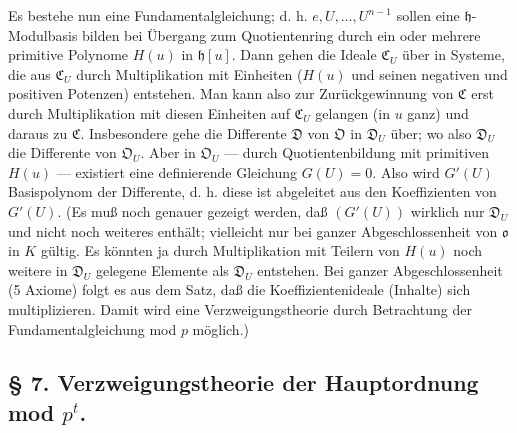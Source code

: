 Es bestehe nun eine Fundamentalgleichung; d. h. $e,U,\ldots,U^{n-1}$ sollen eine $\mathfrak h$-Modulbasis bilden bei Übergang zum Quotientenring durch ein oder mehrere primitive Polynome $H(u)$ in $\mathfrak h[u]$. Dann gehen die Ideale $\mathfrak C_U$ über in Systeme, die aus $\mathfrak C_U$ durch Multiplikation mit Einheiten ($H(u)$ und seinen negativen und positiven Potenzen) entstehen. Man kann also zur Zurückgewinnung von $\mathfrak C$ erst durch Multiplikation mit diesen Einheiten auf $\mathfrak C_U$ gelangen (in $u$ ganz) und daraus zu $\mathfrak C$. Insbesondere gehe die Differente $\mathfrak D$ von $\mathfrak O$ in $\mathfrak D_U$ über; wo also $\mathfrak D_U$ die Differente von $\mathfrak O_U$. Aber in $\mathfrak O_U$ --- durch Quotientenbildung mit primitiven $H(u)$ --- existiert eine definierende Gleichung $G(U)=0$. Also wird $G'(U)$ Basispolynom der Differente, d. h. diese ist abgeleitet aus den Koeffizienten von $G'(U)$. (Es muß noch genauer gezeigt werden, daß $(G'(U))$ wirklich nur $\mathfrak D_U$ und nicht noch weiteres enthält; vielleicht nur bei ganzer Abgeschlossenheit von $\mathfrak o$ in $K$ gültig. Es könnten ja durch Multiplikation mit Teilern von $H(u)$ noch weitere in $\mathfrak D_U$ gelegene Elemente als $\mathfrak D_U$ entstehen. Bei ganzer Abgeschlossenheit (5 Axiome) folgt es aus dem Satz, daß die Koeffizientenideale (Inhalte) sich multiplizieren. Damit wird eine Verzweigungstheorie durch Betrachtung der Fundamentalgleichung mod $p$ möglich.)

\subsection*{\S{} 7. Verzweigungstheorie der Hauptordnung mod $p^t$.}

